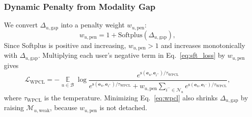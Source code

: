 \subsubsection{\textbf{Dynamic Penalty from Modality Gap}}
We convert $\Delta_{u,\mathrm{gap}}$ into a penalty weight $w_{u,\text{pen}}$:
\begin{equation}
\label{eq:wpen}
w_{u,\text{pen}}
=
1+\mathrm{Softplus}(\Delta_{u,\mathrm{gap}}),
\end{equation}
Since Softplus is positive and increasing, $w_{u,\text{pen}}>1$ and increases monotonically with $\Delta_{u,\mathrm{gap}}$.
Multiplying each user's negative term in Eq.~\ref{eq:sft_loss} by $w_{u,\text{pen}}$ gives
\begin{equation}
\label{eq:wpcl}
    \mathcal{L}_{\text{WPCL}} = -\mathop{\mathbb{E}}\limits_{u \in \mathcal{B}} \log \frac{e^{\text{s}(\mathbf{e}_u, \mathbf{e}_{i^+}) / \tau_{\text{WPCL}}}}{e^{\text{s}(\mathbf{e}_u, \mathbf{e}_{i^+}) / \tau_{\text{WPCL}}} + w_{u,\text{pen}} \sum_{i^- \in \mathcal{N}_u} e^{\text{s}(\mathbf{e}_u, \mathbf{e}_{i^-}) / \tau_{\text{WPCL}}}},
\end{equation}
\noindent where $\tau_{\text{WPCL}}$ is the temperature.
Minimizing Eq.~\ref{eq:wpcl} also shrinks $\Delta_{u,\mathrm{gap}}$ by raising $\mathcal{M}_{u,\text{weak}}$, because $w_{u,\text{pen}}$ is not detached.



